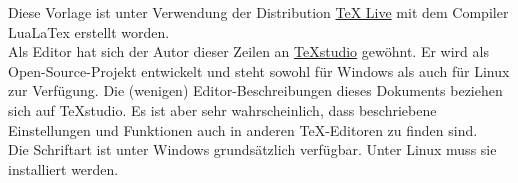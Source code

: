 Diese Vorlage ist unter Verwendung der Distribution \href{https://www.tug.org/texlive/}{TeX Live} mit dem Compiler LuaLaTex erstellt worden.\\
Als Editor hat sich der Autor dieser Zeilen an \href{https://www.texstudio.org/}{TeXstudio} gewöhnt. 
Er wird als Open-Source-Projekt entwickelt und steht sowohl für Windows als auch für Linux zur Verfügung.
Die (wenigen) Editor-Beschreibungen dieses Dokuments beziehen sich auf TeXstudio.
Es ist aber sehr wahrscheinlich, dass beschriebene Einstellungen und Funktionen auch in anderen \TeX -Editoren zu finden sind.\\

Die Schriftart  ist unter Windows grundsätzlich verfügbar. 
Unter Linux muss sie installiert werden.